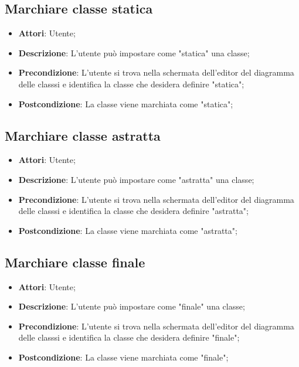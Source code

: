 \documentclass[../AnalisiDeiRequisiti.tex]{subfiles}
\begin{document}
			\subsection{Marchiare classe statica}
			\begin{itemize}
				\item \textbf{Attori}: Utente;
				\item \textbf{Descrizione}: L'utente può impostare come "statica" una classe;
				\item \textbf{Precondizione}: L’utente si trova nella schermata dell’editor del diagramma delle classsi e identifica la classe che desidera definire "statica";
				\item \textbf{Postcondizione}: La classe viene marchiata come "statica";
			\end{itemize}
			
			\subsection{Marchiare classe astratta}
			\begin{itemize}
				\item \textbf{Attori}: Utente;
				\item \textbf{Descrizione}: L'utente può impostare come "astratta" una classe;
				\item \textbf{Precondizione}: L’utente si trova nella schermata dell’editor del diagramma delle classsi e identifica la classe che desidera definire "astratta";
				\item \textbf{Postcondizione}: La classe viene marchiata come "astratta";
			\end{itemize}
			
			\subsection{Marchiare classe finale}
			\begin{itemize}
				\item \textbf{Attori}: Utente;
				\item \textbf{Descrizione}: L'utente può impostare come "finale" una classe;
				\item \textbf{Precondizione}: L’utente si trova nella schermata dell’editor del diagramma delle classsi e identifica la classe che desidera definire "finale";
				\item \textbf{Postcondizione}: La classe viene marchiata come "finale";
			\end{itemize}
			
\end{document}
